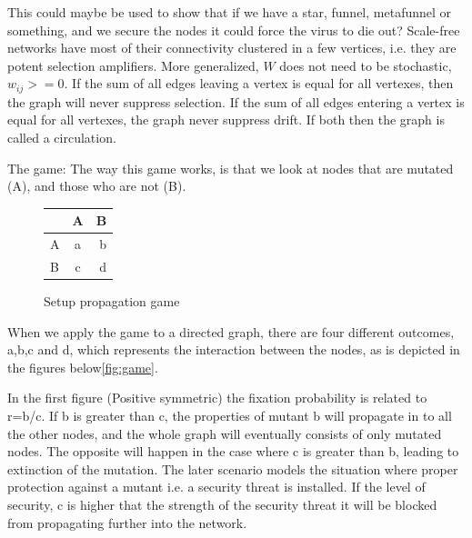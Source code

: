 This could maybe be used to show that if we have a star, funnel, metafunnel or something, and we secure the nodes it could force the virus to die out?
Scale-free networks have most of their connectivity clustered in a few vertices, i.e. they are potent selection amplifiers.
More generalized, $W$ does not need to be stochastic, $w_{ij}>=0$. 
If the sum of all edges leaving a vertex is equal for all vertexes, then the graph will never suppress selection.
If the sum of all edges entering a vertex is equal for all vertexes, the graph never suppress drift.
If both then the graph is called a circulation.
 
The game:
The way this game works, is that we look at nodes that are mutated (A), and those who are not (B).  
\begin{figure}
\centering 
\begin{tabular}{ l | c | r }
  
   & A & B \\  \hline  
  A & a & b \\ \hline  
  B & c & d \\
  
\end{tabular}
\caption{\label{fig:gamesetup} Setup propagation game \cite{lieberman2005evolutionary}}
\end{figure}

When we apply the game to a directed graph, there are four different outcomes, a,b,c and d, which represents the interaction between the nodes, as is depicted in the figures below\ref{fig:game}. 

In the first figure (Positive symmetric) the fixation probability is related to r=b/c. If b is greater than c, the properties of mutant b will propagate in to all the other nodes, and the whole graph will eventually consists of only mutated nodes. The opposite will happen in the case where c is greater than b, leading to extinction of the mutation. The later scenario models the situation where proper protection against a mutant i.e. a security threat is installed. If the level of security, c is higher that the strength of the security threat it will be blocked from propagating further into the network. 

